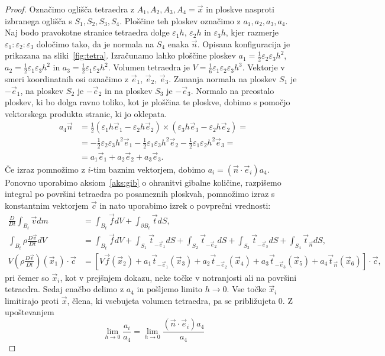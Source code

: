 \documentclass[12pt,a4paper,twoside]{article}
\theoremstyle{definition} %
\theoremstyle{plain} %
\numberwithin{equation}{section}
\newcommand{\eps}{\varepsilon}
\newcommand{\DD}[2]{\ensuremath{\frac{D #1}{D #2}}}
\newcommand{\DDt}[1]{\DD{#1}{t}}
\newcommand{\vv}{\vec{v}}
\newcommand{\vt}{\vec{t}}
\newcommand{\vc}{\vec{c}}
\newcommand{\vn}{\vec{n}}
\newcommand{\vf}{\vec{f}}
\newcommand{\vx}{\vec{x}}
\newcommand{\ei}{\vec{e}_1}
\newcommand{\ej}{\vec{e}_2}
\newcommand{\ek}{\vec{e}_3}
\begin{document}
\begin{proof}
Označimo oglišča tetraedra z $A_1, A_2, A_3, A_4 = \vx$ in ploskve nasproti izbranega oglišča s
$S_1, S_2, S_3, S_4$. Ploščine teh ploskev označimo z $a_1, a_2, a_3, a_4$. Naj bodo pravokotne
stranice tetraedra dolge $\eps_1 h$, $\eps_2 h$ in $\eps_3 h$, kjer razmerje $\eps_1 : \eps_2 :
\eps_3$ določimo tako, da je normala na $S_4$ enaka $\vn$. Opisana konfiguracija je prikazana na
sliki~\ref{fig:tetra}. Izračunamo lahko ploščine ploskev $a_1 = \frac12 \eps_2\eps_3h^2$,
$a_2 = \frac12 \eps_1\eps_3h^2$ in $a_3 = \frac12 \eps_1\eps_2h^2$. Volumen tetraedra je $V =
\frac16 \eps_1\eps_2\eps_3h^3$. Vektorje v smeri koordinatnih osi označimo z $\ei$,
$\ej$, $\ek$. Zunanja normala na ploskev $S_1$ je $-\ei$, na ploskev $S_2$ je $-\ej$ in na ploskev
$S_3$ je $-\ek$. Normalo na preostalo ploskev, ki bo dolga ravno toliko, kot je ploščina te ploskve,
dobimo s pomočjo vektorskega produkta stranic, ki jo oklepata.
\begin{align*}
  a_4\vn &= \frac12 (\eps_1h \ei - \eps_2h \ej) \times (\eps_3h \ek - \eps_2h
  \ej) = \\ &=
  -\frac12 \eps_2\eps_3 h^2\ei
  -\frac12 \eps_1\eps_3 h^2\ej
  -\frac12 \eps_1\eps_2 h^2\ek = \\
  &= a_1 \ei + a_2 \ej + a_3 \ek.
\end{align*}
Če izraz pomnožimo z $i$-tim baznim vektorjem, dobimo $a_i = (\vn\cdot\vec{e}_i) a_4$.  Ponovno
uporabimo aksiom~\ref{aks:gib} o ohranitvi gibalne količine, razpišemo integral po površini
tetraedra po posameznih ploskvah, pomnožimo izraz s konstantnim vektorjem $\vc$ in nato uporabimo
izrek o povprečni vrednosti:
\begin{align*}
  \DDt{} \int_{B_t} \vv dm &= \int_{B_t} \vf dV + \int_{\partial {B_t}} \vt dS, \\
\int_{B_t} \rho\DDt{\vv} dV &= \int_{B_t} \vf dV +
  \int_{S_1} \vt_{-\ei} dS +
  \int_{S_2} \vt_{-\ej} dS +
  \int_{S_3} \vt_{-\ek} dS +
  \int_{S_4} \vt_{\vn} dS,
  \\
  V (\rho\DDt{\vv})(\vx_1)\cdot\vc &= \left[V \vf(\vx_2) +
  a_1 \vt_{-\ei}(\vx_3) + a_2 \vt_{-\ej}(\vx_4) + a_3 \vt_{-\ek}(\vx_5) + a_4
\vt_{\vn}(\vx_6)\right]\cdot \vc,
\end{align*}
pri čemer so $\vx_i$, kot v prejšnjem dokazu, neke točke v notranjosti ali na
površini tetraedra. Sedaj enačbo delimo z $a_4$ in pošljemo limito $h \to 0$.
Vse točke $\vx_i$ limitirajo proti $\vx$, člena, ki vsebujeta volumen tetraedra,
pa se približujeta 0. Z upoštevanjem
\[
  \lim_{h\to0} \frac{a_i}{a_4} = \lim_{h\to0}\frac{(\vn\cdot\vec{e}_i) a_4}{a_4}
\]
\end{proof}
\end{document}
